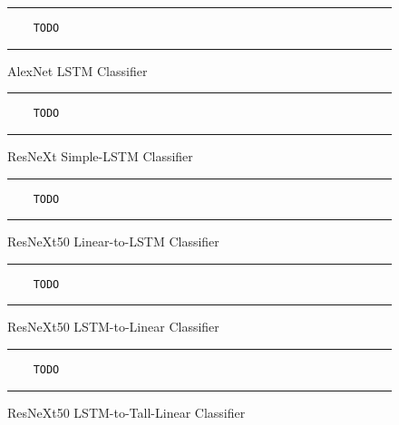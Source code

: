 \begin{figure}
  \caption{AlexNet LSTM Classifier}
  \label{fig:cnnAlexNetLSTM}
  \par\noindent\rule{\textwidth}{0.5pt}
  \begin{\codefigsize}
  \begin{lstlisting}
    TODO
  \end{lstlisting}
  \end{\codefigsize}
  \par\noindent\rule{\textwidth}{0.5pt}
\end{figure}

\begin{figure}
  \caption{ResNeXt Simple-LSTM Classifier}
  \label{fig:cnnResNeXt50SimpleLSTM}
  \par\noindent\rule{\textwidth}{0.5pt}
  \begin{\codefigsize}
  \begin{lstlisting}
    TODO
  \end{lstlisting}
  \end{\codefigsize}
  \par\noindent\rule{\textwidth}{0.5pt}
\end{figure}

\begin{figure}
  \caption{ResNeXt50 Linear-to-LSTM Classifier}
  \label{fig:cnnResNeXt50Linear2LSTM}
  \par\noindent\rule{\textwidth}{0.5pt}
  \begin{\codefigsize}
  \begin{lstlisting}
    TODO
  \end{lstlisting}
  \end{\codefigsize}
  \par\noindent\rule{\textwidth}{0.5pt}
\end{figure}

\begin{figure}
  \caption{ResNeXt50 LSTM-to-Linear Classifier}
  \label{fig:cnnResNeXt50LSTM2Linear}
  \par\noindent\rule{\textwidth}{0.5pt}
  \begin{\codefigsize}
  \begin{lstlisting}
    TODO
  \end{lstlisting}
  \end{\codefigsize}
  \par\noindent\rule{\textwidth}{0.5pt}
\end{figure}

\begin{figure}
  \caption{ResNeXt50 LSTM-to-Tall-Linear Classifier}
  \label{fig:cnnResNeXt50LSTM2TallLinear}
  \par\noindent\rule{\textwidth}{0.5pt}
  \begin{\codefigsize}
  \begin{lstlisting}
    TODO
  \end{lstlisting}
  \end{\codefigsize}
  \par\noindent\rule{\textwidth}{0.5pt}
\end{figure}

